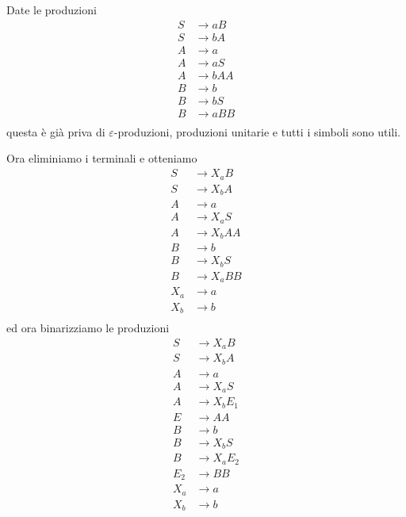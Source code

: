 \documentclass[12pt]{report}
\theoremstyle{definition}
\begin{document}
\begin{tcolorbox}[breakable]
	Date le produzioni
	\begin{align*}
		S &\rightarrow a B \\
		S &\rightarrow b A \\
		A &\rightarrow a \\
		A &\rightarrow a S \\
		A &\rightarrow b A A \\
		B &\rightarrow b \\
		B &\rightarrow b S \\
		B &\rightarrow a B B \\
	\end{align*}
	questa è già priva di $\varepsilon$-produzioni, produzioni unitarie e tutti i simboli sono utili.

	Ora eliminiamo i terminali e otteniamo
	\begin{align*}
		S &\rightarrow X_a B \\
		S &\rightarrow X_b A \\
		A &\rightarrow a \\
		A &\rightarrow X_a S \\
		A &\rightarrow X_b A A \\
		B &\rightarrow b \\
		B &\rightarrow X_b S \\
		B &\rightarrow X_a B B \\
		X_a &\rightarrow a \\
		X_b &\rightarrow b \\
	\end{align*}
	ed ora binarizziamo le produzioni
	\begin{align*}
		S &\rightarrow X_a B \\
		S &\rightarrow X_b A \\
		A &\rightarrow a \\
		A &\rightarrow X_a S \\
		A &\rightarrow X_b E_1 \\
		E &\rightarrow A A \\
		B &\rightarrow b \\
		B &\rightarrow X_b S \\
		B &\rightarrow X_a E_2 \\
		E_2 &\rightarrow B B \\
		X_a &\rightarrow a \\
		X_b &\rightarrow b \\
	\end{align*}
\end{tcolorbox}
\end{document}
